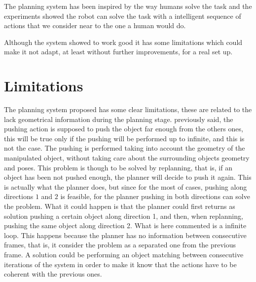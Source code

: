 The planning system has been inspired by the way humans solve the task and the experiments showed the robot can solve the task with a intelligent sequence of actions that we consider near to the one a human would do.  

Although the system showed to work good it has some limitations which could make it not adapt, at least without further improvements, for a real set up. 

\section*{Limitations}
The planning system proposed has some clear limitations, these are related to the lack geometrical information during the planning stage. 
 previously said, the pushing action is supposed to push the object far enough from the others ones, this will be true only if the pushing will be performed up to infinite, and this is not the case. The pushing is performed taking into account the geometry of the manipulated object, without taking care about the surrounding objects geometry and poses. This problem is though to be solved by replanning, that is, if an object has been not pushed enough, the planner will decide to push it again. This is actually what the planner does, but since for the most of cases, pushing along directions $1$ and $2$ is feasible, for the planner pushing in both directions can solve the problem. What it could happen is that the planner could first returns as solution pushing a certain object along direction 1, and then, when replanning, pushing the same object along direction 2. What is here commented is a infinite loop. This happens because the planner has no information between consecutive frames, that is, it consider the problem as a separated one from the previous frame. 
A solution could be performing an object matching between consecutive iterations of the system in order to make it know that the actions have to be coherent with the previous ones. 

